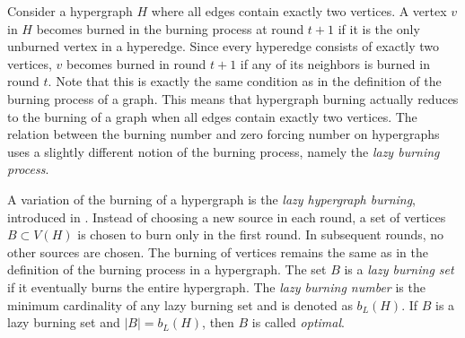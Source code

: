 \documentclass[12pt]{article}
\theoremstyle{plain}
\theoremstyle{definition}
\theoremstyle{remark}
\begin{document}
Consider a hypergraph $H$ where all edges contain exactly two vertices. A vertex $v$ in $H$ becomes burned in the burning process at round $t+1$ if it is the only unburned vertex in a hyperedge. Since every hyperedge consists of exactly two vertices, $v$ becomes burned in round $t+1$ if any of its neighbors is burned in round $t$.
Note that this is exactly the same condition as in the definition of the burning process of a graph.
This means that hypergraph burning actually reduces to the burning of a graph when all edges contain exactly two vertices.
The relation between the burning number and zero forcing number on hypergraphs uses a slightly different notion of the burning process, namely the \textit{lazy burning process}.


A variation of the burning of a hypergraph is the \textit{lazy hypergraph burning}, introduced in \cite{hypergraph}.
Instead of choosing a new source in each round, a set of vertices $B\subset V(H)$ is chosen to burn only in the first round. In subsequent rounds, no other sources are chosen.
The burning of vertices remains the same as in the definition of the burning process in a hypergraph.
The set $B$ is a \textit{lazy burning set} if it eventually burns the entire hypergraph.
The \textit{lazy burning number} is the minimum cardinality of any lazy burning set and is denoted as $b_L(H)$. 
If $B$ is a lazy burning set and $|B|=b_L(H)$, then $B$ is called \textit{optimal}.
\end{document}
